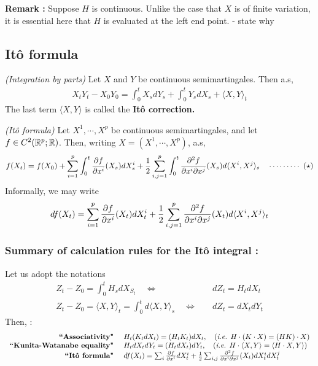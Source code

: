 \documentclass[10pt,a4paper]{article}
\begin{document}
\textbf{Remark :} Suppose $H$ is continuous. Unlike the case that $X$ is of finite variation, it is essential here that $H$ is evaluated at the left end point. - state why

\subsection{It\^o formula}

\thm \emph{(Integration by parts)} Let $X$ and $Y$ be continuous semimartingales. Then a.s,
\begin{align*}
X_t Y_t - X_0 Y_0 = \int_0^t X_s dY_s + \int_0^t Y_s dX_s + \langle X, Y \rangle_t
\end{align*}
The last term $\langle X, Y \rangle$ is called the \textbf{It\^o correction.}
\s

\thm \emph{(It\^o formula)} Let $X^1, \cdots, X^p$ be continuous semimartingales, and let $f \in C^2(\mathbb{R}^p ; \mathbb{R})$. Then, writing $X = (X^1, \cdots, X^p)$, a.s,
\begin{align*}
f(X_t) =  f(X_0) + \sum_{i=1}^p \int_0^t \frac{\partial f}{\partial x^i}(X_s)dX_s^i + \frac{1}{2} \sum_{i,j=1}^p \int_0^t \frac{\partial^2 f}{\partial x^i \partial x^j} (X_s) d\langle X^i, X^j \rangle_s \quad \cdots\cdots\cdots\,\,(\star)
\end{align*}
Informally, we may write
\begin{align*}
df(X_t) = \sum_{i=1}^p \frac{\partial f}{\partial x^i} (X_t) dX_t^i + \frac{1}{2} \sum_{i,j=1}^p \frac{\partial^2 f}{\partial x^i \partial x^j}(X_t) d\langle X^i, X^j \rangle_t
\end{align*}

\subsubsection*{Summary of calculation rules for the It\^o integral :}

Let us adopt the notations
\begin{align*}
Z_t - Z_0 = \int_0^t H_s dX_{S_t} \quad \Leftrightarrow & \quad dZ_t = H_t dX_t \\
Z_t - Z_0 = \langle X, Y\rangle_t =\int_0^t d\langle X, Y \rangle_s \quad \Leftrightarrow & \quad dZ_t = dX_t dY_t
\end{align*}
Then, :
\begin{align*}
\begin{array}{rl}
\textbf{``Associativity" }  & H_t (K_t dX_t) = (H_t K_t) dX_t, \quad (\textit{i.e. } H\cdot (K \cdot X) = (HK) \cdot X) \\
\textbf{``Kunita-Watanabe equality" } & H_t dX_t dY_t = (H_t dX_t) dY_t, \quad (\textit{i.e. } H\cdot \langle X, Y \rangle = \langle H\cdot X, Y \rangle )\\
\textbf{``It\^o formula" } & df(X_t) = \sum_{i}\frac{\partial f}{\partial x^i} dX_t^i + \frac{1}{2} \sum_{i,j} \frac{\partial^2 f}{\partial x^i \partial x^j} (X_t) dX_t^i dX_t^j
\end{array}
\end{align*}
\end{document}
